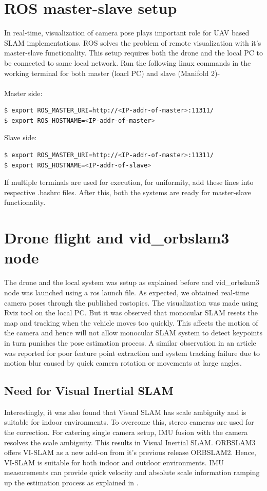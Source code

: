 \section{ROS master-slave setup}
\label{sec:masterslavesetup}
In real-time, visualization of camera pose plays important role for UAV based SLAM implementations. ROS solves the problem of remote visualization with it's master-slave functionality. This setup requires both the drone and the local PC to be connected to same local network. Run the following linux commands in the working terminal for both master (loacl PC) and slave (Manifold 2)-\\
\\
Master side:
\begin{lstlisting}[language=bash, basicstyle=\small]
$ export ROS_MASTER_URI=http://<IP-addr-of-master>:11311/
$ export ROS_HOSTNAME=<IP-addr-of-master>
\end{lstlisting}
Slave side:
\begin{lstlisting}[language=bash, basicstyle=\small]
$ export ROS_MASTER_URI=http://<IP-addr-of-master>:11311/
$ export ROS_HOSTNAME=<IP-addr-of-slave>
\end{lstlisting}

If multiple terminals are used for execution, for uniformity, add these lines into respective .bashrc files. After this, both the systems are ready for master-slave functionality.

\section{Drone flight and vid\_orbslam3 node}
\label{sec:droneflight}
The drone and the local system was setup as explained before and  vid\_orbslam3 node was launched using a ros launch file. As expected, we obtained real-time camera poses through the published rostopics. The visualization was made using Rviz tool on the local PC. But it was observed that monocular SLAM resets the map and tracking when the vehicle moves too quickly. This affects the motion of the camera and hence will not allow monocular SLAM system to detect keypoints in turn punishes the pose estimation process. A similar observation in an article \cite{Luo2020} was reported for poor feature point extraction and system tracking failure due to motion blur caused by quick camera rotation or movements at large angles.

\subsection*{Need for Visual Inertial SLAM}
Interestingly, it was also found that Visual SLAM has scale ambiguity and is suitable for indoor environments. To overcome this, stereo cameras are used for the correction. For catering single camera setup, IMU fusion with the camera resolves the scale ambiguity. This results in Visual Inertial SLAM. ORBSLAM3 offers VI-SLAM as a new add-on from it's previous release ORBSLAM2. Hence, VI-SLAM is suitable for both indoor and outdoor environments. IMU measurements can provide quick velocity and absolute scale information ramping up the estimation process as explained in \cite{7487266}.

